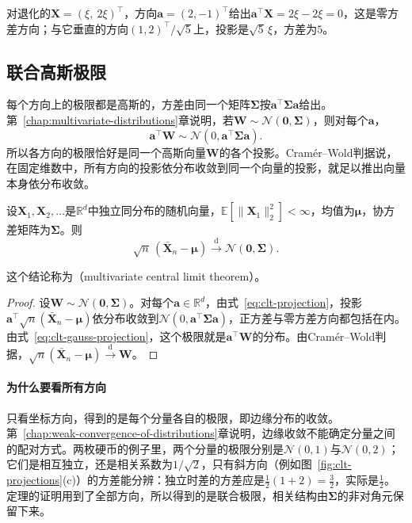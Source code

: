 对退化的$\bm{X}=(\xi,\ 2\xi)^{\top}$，方向$\bm{a}=(2,-1)^{\top}$给出$\bm{a}^{\top}\bm{X}=2\xi-2\xi=0$，这是零方差方向；与它垂直的方向$(1,2)^{\top}/\sqrt5$上，投影是$\sqrt5\,\xi$，方差为$5$。

\subsection{联合高斯极限}
\label{sec:clt-joint}

每个方向上的极限都是高斯的，方差由同一个矩阵$\bm{\Sigma}$按$\bm{a}^{\top}\bm{\Sigma}\bm{a}$给出。第~\ref{chap:multivariate-distributions}章说明，若$\bm{W}\sim\mathcal{N}(\bm{0},\bm{\Sigma})$，则对每个$\bm{a}$，
\begin{equation}
 \bm{a}^{\top}\bm{W}\sim\mathcal{N}(0,\bm{a}^{\top}\bm{\Sigma}\bm{a}) .
 \label{eq:clt-gauss-projection}
\end{equation}
所以各方向的极限恰好是同一个高斯向量$\bm{W}$的各个投影。Cramér--Wold判据说，在固定维数中，所有方向的投影依分布收敛到同一个向量的投影，就足以推出向量本身依分布收敛。

\begin{theorem}[多元中心极限定理]
\label{thm:clt-multivariate}
设$\bm{X}_1,\bm{X}_2,\dots$是$\mathbb{R}^{d}$中独立同分布的随机向量，$\mathbb{E}[\lVert\bm{X}_1\rVert_2^2]<\infty$，均值为$\bm{\mu}$，协方差矩阵为$\bm{\Sigma}$。则
\begin{equation}
 \sqrt{n}\,(\bar{\bm{X}}_n-\bm{\mu})\xrightarrow{\mathrm{d}}\mathcal{N}(\bm{0},\bm{\Sigma}) .
 \label{eq:clt-multivariate}
\end{equation}
\end{theorem}

这个结论称为（multivariate central limit theorem）。

\begin{proof}
设$\bm{W}\sim\mathcal{N}(\bm{0},\bm{\Sigma})$。对每个$\bm{a}\in\mathbb{R}^{d}$，由式~\eqref{eq:clt-projection}，投影$\bm{a}^{\top}\sqrt{n}(\bar{\bm{X}}_n-\bm{\mu})$依分布收敛到$\mathcal{N}(0,\bm{a}^{\top}\bm{\Sigma}\bm{a})$，正方差与零方差方向都包括在内。由式~\eqref{eq:clt-gauss-projection}，这个极限就是$\bm{a}^{\top}\bm{W}$的分布。由Cramér--Wold判据，$\sqrt{n}(\bar{\bm{X}}_n-\bm{\mu})\xrightarrow{\mathrm{d}}\bm{W}$。
\end{proof}

\paragraph{为什么要看所有方向}
只看坐标方向，得到的是每个分量各自的极限，即边缘分布的收敛。第~\ref{chap:weak-convergence-of-distributions}章说明，边缘收敛不能确定分量之间的配对方式。两枚硬币的例子里，两个分量的极限分别是$\mathcal{N}(0,1)$与$\mathcal{N}(0,2)$；它们是相互独立，还是相关系数为$1/\sqrt2$，只有斜方向（例如图~\ref{fig:clt-projections}(c)）的方差能分辨：独立时差的方差应是$\frac12(1+2)=\frac32$，实际是$\frac12$。定理的证明用到了全部方向，所以得到的是联合极限，相关结构由$\bm{\Sigma}$的非对角元保留下来。

